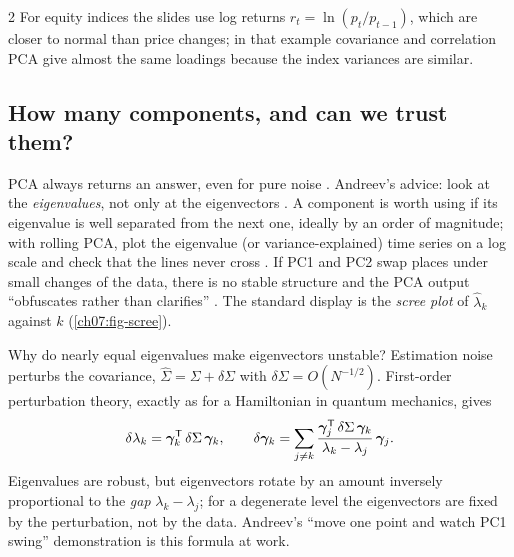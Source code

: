 \begin{paracol}{2}
For equity indices the slides use log returns $r_t=\ln(p_t/p_{t-1})$, which are closer to normal than price
changes; in that example covariance and correlation PCA give almost the same loadings because the index
variances are similar.

\subsection{How many components, and can we trust them?}\label{ch07:sec-robust}
PCA always returns an answer, even for pure noise . Andreev's advice: look at the
\emph{eigenvalues}, not only at the eigenvectors . A component is worth using if its eigenvalue
is well separated from the next one, ideally by an order of magnitude; with rolling PCA, plot the eigenvalue
(or variance-explained) time series on a log scale and check that the lines never cross . If
PC1 and PC2 swap places under small changes of the data, there is no stable structure and the PCA output
``obfuscates rather than clarifies'' . The standard display is the \emph{scree plot} of
$\hat\lambda_k$ against $k$ (\cref{ch07:fig-scree}).

\begin{intuition}
Why do nearly equal eigenvalues make eigenvectors unstable? Estimation noise perturbs the covariance,
$\hat\Sigma=\Sigma+\delta\Sigma$ with $\delta\Sigma=O(N^{-1/2})$. First-order perturbation theory, exactly as for a
Hamiltonian in quantum mechanics, gives
\[
  \delta\lambda_k=\bm\gamma_k^{\mathsf T}\,\delta\Sigma\,\bm\gamma_k,\qquad
  \delta\bm\gamma_k=\sum_{j\ne k}\frac{\bm\gamma_j^{\mathsf T}\,\delta\Sigma\,\bm\gamma_k}{\lambda_k-\lambda_j}\,\bm\gamma_j .
\]
Eigenvalues are robust, but eigenvectors rotate by an amount inversely proportional to the \emph{gap}
$\lambda_k-\lambda_j$; for a degenerate level the eigenvectors are fixed by the perturbation, not by the data.
Andreev's ``move one point and watch PC1 swing'' demonstration  is this formula at work.
\end{intuition}


\end{paracol}

